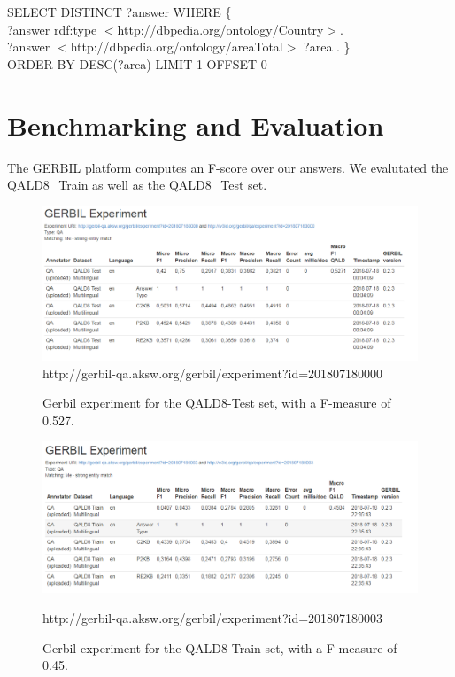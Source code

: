 \documentclass[runningheads]{llncs}
\begin{document}
\raggedbottom
\begin{example}
	SELECT DISTINCT ?answer WHERE \{ \\
	\tab[1.8cm] ?answer rdf:type $<$http://dbpedia.org/ontology/Country$>$. \\
	\tab[1.8cm] ?answer $<$http://dbpedia.org/ontology/areaTotal$>$ ?area . \} \\
	\tab[1.8cm]	ORDER BY DESC(?area) LIMIT 1 OFFSET 0\end{example}

\pagebreak
\section{Benchmarking and Evaluation} 

The GERBIL platform computes an F-score over our answers. We evalutated the QALD8\_Train as well as the QALD8\_Test set.

\begin{figure}[H]
	\includegraphics[width=\textwidth]{QALD-8-Test.PNG}
	 http://gerbil-qa.aksw.org/gerbil/experiment?id=201807180000
	\caption{Gerbil experiment for the QALD8-Test set, with a F-measure of 0.527.}
	\label{fig2} 
\end{figure}


\begin{figure}
	\includegraphics[width=\textwidth]{QALD-8-Train.PNG}
	
	 http://gerbil-qa.aksw.org/gerbil/experiment?id=201807180003
	\caption{Gerbil experiment for the QALD8-Train set, with a F-measure of 0.45.}
	\label{fig3} 
\end{figure}
\end{document}

